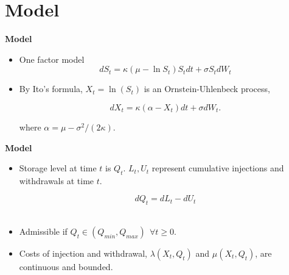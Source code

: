 \documentclass{beamer}
\begin{document}
\section{Model}
\begin{frame}
{\bf Model}
\begin{itemize}
  \item One factor model
\begin{equation*}
  dS_t = \kappa ( \mu - \ln S_t)S_t dt + \sigma S_t dW_t
\end{equation*}
\item By Ito's formula, $X_t = \ln(S_t)$ is an Ornstein-Uhlenbeck process,

\begin{equation*}
  dX_t = \kappa ( \alpha - X_t) dt + \sigma dW_t.
\end{equation*}

where $\alpha  = \mu - \sigma^2/(2\kappa)$.
\end{itemize}

\end{frame}

\begin{frame}
{\bf Model}
\begin{itemize}
\item Storage level at time $t$ is $Q_t$. $L_t,U_t$ represent cumulative injections and withdrawals at time $t$.

\begin{equation*}
  dQ_t = dL_t - dU_t
\end{equation*}
\\
\item Admissible if $Q_t \in (Q_{min},Q_{max})~~ \forall t \geq 0$.

\item Costs of injection and withdrawal, $\lambda(X_t,Q_t)$ and $\mu(X_t,Q_t)$, are continuous and bounded.

\end{itemize}

\end{frame}
\end{document}
